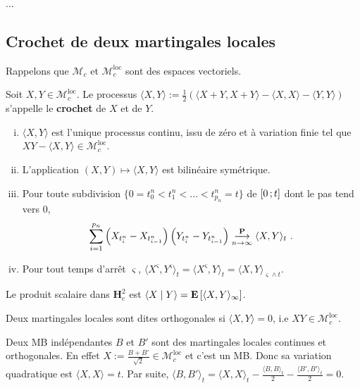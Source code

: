 	...%


\subsection{Crochet de deux martingales locales}

	Rappelons que $\mathcal{M}_c$ et $\mathcal{M}^{\text{loc}}_c$ sont des espaces vectoriels.
	
	\begin{defn}
		Soit $X, Y \in \mathcal{M}^{\text{loc}}_c$.
		Le processus $\langle X,Y \rangle := \frac{1}{2} \left( \langle X+Y,X+Y \rangle - \langle X,X \rangle - \langle Y,Y \rangle \right)$ s'appelle le \textbf{crochet} de $X$ et de $Y$.
	\end{defn}
	
	\begin{pop}
		\begin{enumerate}[(i)]
			\item 	$\langle X,Y \rangle$ est l'unique processus continu, issu de zéro et à variation finie tel que $XY - \langle X,Y \rangle \in \mathcal{M}^{\text{loc}}_c$.
			\item L'application $(X,Y) \mapsto \langle X,Y \rangle$ est bilinéaire symétrique.
			\item Pour toute subdivision $\{ 0 = t_0^n < t_1^n < \ldots < t_{p_n}^n = t \}$ de $\mathopen{}\mathclose{\left[0\mathclose{}\mathpunct{};t\right]}$ dont le pas tend vers $0$,
				$$\sum_{i = 1}^{p_n} \left( X_{t_i^n} - X_{t_{i - 1}^n} \right) \left( Y_{t_i^n} - Y_{t_{i - 1}^n} \right) \overset{\mathbf{P}}{\underset{n \to \infty}{\longrightarrow}} \langle X,Y \rangle_t\ .$$
			\item Pour tout temps d'arrêt $\varsigma$, $\langle X^{\varsigma},Y^{\varsigma} \rangle_t = \langle X^{\varsigma},Y \rangle_t = \langle X,Y \rangle_{\varsigma \wedge t}$.
		\end{enumerate}
	\end{pop}
	
	\begin{pop}
		Le produit scalaire dans $\mathbf{H}_c^2$ est $\left\langle X \mid Y \right\rangle = \mathbf{E} \left[ \langle X,Y \rangle_\infty \right]$.
	\end{pop}
	
	\begin{defn}
		Deux martingales locales sont dites orthogonales si $\langle X,Y \rangle = 0$, i.e $XY \in \mathcal{M}^{\text{loc}}_c$.
	\end{defn}
	
	\begin{ex}
		Deux MB indépendantes $B$ et $B'$ sont des martingales locales continues et orthogonales.
		En effet $X := \frac{B + B'}{\sqrt 2} \in \mathcal{M}^{\text{loc}}_c$ et c'est un MB.
		Donc sa variation quadratique est $\langle X,X \rangle = t$.
		Par suite, $\langle B,B' \rangle_t = \langle X,X \rangle_t - \frac{\langle B,B \rangle_t}{2} - \frac{\langle B',B' \rangle_t}{2} = 0$.
	\end{ex}
	
